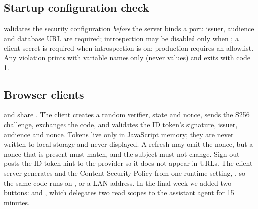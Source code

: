 \subsection{Startup configuration check}
 validates the security configuration \emph{before} the server binds a port: issuer, audience and database URL are required; introspection may be disabled only when ; a client secret is required when introspection is on; production requires an  allowlist. Any violation prints  with variable names only (never values) and exits with code 1.

\subsection{Browser clients}
 and  share . The client creates a random verifier, state and nonce, sends the S256 challenge, exchanges the code, and validates the ID token's signature, issuer, audience and nonce. Tokens live only in JavaScript memory; they are never written to local storage and never displayed. A refresh may omit the nonce, but a nonce that is present must match, and the subject must not change. Sign-out posts the ID-token hint to the provider so it does not appear in URLs. The client server generates  and the Content-Security-Policy from one runtime setting, , so the same code runs on ,  or a LAN address. In the final week we added two buttons:  and , which delegates two read scopes to the assistant agent for 15 minutes.

